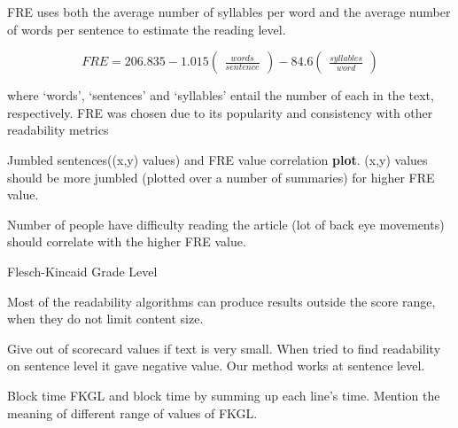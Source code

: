 \documentclass[12pt]{article}
\begin{document}
FRE uses both the average number of syllables per word and the average number of words per sentence to estimate the reading level.

\begin{equation}
FRE = 206.835 - 1.015\begin{pmatrix}
\frac{words}{sentence}
\end{pmatrix} - 84.6\begin{pmatrix}\frac{syllables}{word}\end{pmatrix}
\end{equation}

where `words', `sentences' and `syllables'
entail the number of each in the text, respectively.
FRE was chosen due to its popularity and consistency with other
readability metrics \cite{didegah2013factors, kincaid1975derivation}


Jumbled sentences((x,y) values) and FRE value correlation \textbf{plot}. 
(x,y) values should be more jumbled (plotted over a number of summaries) for higher FRE value.

Number of people have difficulty reading the article (lot of back eye movements) should correlate with the higher FRE value.


Flesch-Kincaid Grade Level

Most of the readability algorithms can produce results outside the score range, when they do not limit content size.

Give out of scorecard values if text is very small. When tried to find readability on sentence level it gave negative value. Our method works at sentence level.

Block time FKGL and block time by summing up each line's time.
Mention the meaning of different range of values of FKGL.
\end{document}
